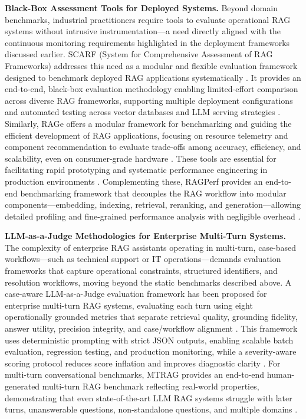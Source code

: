 \documentclass[11pt]{article}
\begin{document}
\textbf{Black-Box Assessment Tools for Deployed Systems.} Beyond domain benchmarks, industrial practitioners require tools to evaluate operational RAG systems without intrusive instrumentation---a need directly aligned with the continuous monitoring requirements highlighted in the deployment frameworks discussed earlier. SCARF (System for Comprehensive Assessment of RAG Frameworks) addresses this need as a modular and flexible evaluation framework designed to benchmark deployed RAG applications systematically \cite{ref584}. It provides an end-to-end, black-box evaluation methodology enabling limited-effort comparison across diverse RAG frameworks, supporting multiple deployment configurations and automated testing across vector databases and LLM serving strategies \cite{ref584}. Similarly, RAGe offers a modular framework for benchmarking and guiding the efficient development of RAG applications, focusing on resource telemetry and component recommendation to evaluate trade-offs among accuracy, efficiency, and scalability, even on consumer-grade hardware \cite{ref585}. These tools are essential for facilitating rapid prototyping and systematic performance engineering in production environments \cite{ref585}. Complementing these, RAGPerf provides an end-to-end benchmarking framework that decouples the RAG workflow into modular components---embedding, indexing, retrieval, reranking, and generation---allowing detailed profiling and fine-grained performance analysis with negligible overhead \cite{ref586}.

\textbf{LLM-as-a-Judge Methodologies for Enterprise Multi-Turn Systems.} The complexity of enterprise RAG assistants operating in multi-turn, case-based workflows---such as technical support or IT operations---demands evaluation frameworks that capture operational constraints, structured identifiers, and resolution workflows, moving beyond the static benchmarks described above. A case-aware LLM-as-a-Judge evaluation framework has been proposed for enterprise multi-turn RAG systems, evaluating each turn using eight operationally grounded metrics that separate retrieval quality, grounding fidelity, answer utility, precision integrity, and case/workflow alignment \cite{ref420}. This framework uses deterministic prompting with strict JSON outputs, enabling scalable batch evaluation, regression testing, and production monitoring, while a severity-aware scoring protocol reduces score inflation and improves diagnostic clarity \cite{ref420}. For multi-turn conversational benchmarks, MTRAG provides an end-to-end human-generated multi-turn RAG benchmark reflecting real-world properties, demonstrating that even state-of-the-art LLM RAG systems struggle with later turns, unanswerable questions, non-standalone questions, and multiple domains \cite{ref587}.
\end{document}
